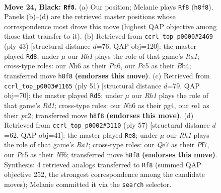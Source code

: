 \documentclass[11pt]{article}
\begin{document}
\clearpage

\begin{figure}[p]\centering
\begin{subfigure}{0.46\textwidth}\centering
\resizebox{\linewidth}{!}{%
\newchessgame
\chessboard[
  setfen={1k5r/p1p1q1pp/1p2p2n/2p1Q3/8/2P2P2/1P4PP/2K1R3 b - - 3 24},
  showmover=false,
  pgfstyle=straightmove, color=movearrow, markmove={h8-f8}
]}
\caption{}
\end{subfigure}\hfill
\begin{subfigure}{0.46\textwidth}\centering
\resizebox{\linewidth}{!}{%
\newchessgame
\chessboard[
  setfen={r5k1/1p2qppp/p7/3Qp3/PbP5/4P3/1B3PPP/R5K1 b - - 2 22},
  showmover=false,
  pgfstyle=straightmove, color=movearrow, markmove={a8-d8}
]}
\caption{}
\end{subfigure}
\\[4pt]
\begin{subfigure}{0.46\textwidth}\centering
\resizebox{\linewidth}{!}{%
\newchessgame
\chessboard[
  setfen={3r2k1/2q1pp1p/2p3p1/p7/P1Q2PP1/1P6/2P4P/2K1R3 b - - 2 26},
  showmover=false,
  pgfstyle=straightmove, color=movearrow, markmove={d8-d5}
]}
\caption{}
\end{subfigure}\hfill
\begin{subfigure}{0.46\textwidth}\centering
\resizebox{\linewidth}{!}{%
\newchessgame
\chessboard[
  setfen={r5k1/p1q2p2/1p3np1/2p3Q1/5P2/2P3N1/P5PP/4R1K1 b - - 0 29},
  showmover=false,
  pgfstyle=straightmove, color=movearrow, markmove={a8-e8}
]}
\caption{}
\end{subfigure}
\caption{\textbf{Move 24, Black: \texttt{Rf8}.} (a) Our position; Melanie plays \texttt{Rf8} (\texttt{h8f8}). Panels (b)--(d) are the retrieved master positions whose correspondence most drove this move (highest QAP objective among those that transfer to it). (b) Retrieved from \texttt{ccrl\_top\_p0000\#2469} (ply 43) [structural distance $d$=76, QAP obj=120]: the master played \texttt{Rd8}; under $\mu$ our \emph{Rh1} plays the role of that game's \emph{Ra1}; cross-type roles: our \emph{N}h6 as their \emph{P}a6, our \emph{P}c5 as their \emph{B}b4; transferred move \texttt{h8f8} \textbf{(endorses this move)}. (c) Retrieved from \texttt{ccrl\_top\_p0003\#1165} (ply 51) [structural distance $d$=79, QAP obj=70]: the master played \texttt{Rd5}; under $\mu$ our \emph{Rh1} plays the role of that game's \emph{Rd1}; cross-type roles: our \emph{N}h6 as their \emph{p}g4, our \emph{r}e1 as their \emph{p}c2; transferred move \texttt{h8f8} \textbf{(endorses this move)}. (d) Retrieved from \texttt{ccrl\_top\_p0002\#3110} (ply 57) [structural distance $d$=62, QAP obj=41]: the master played \texttt{Re8}; under $\mu$ our \emph{Rh1} plays the role of that game's \emph{Ra1}; cross-type roles: our \emph{Q}e7 as their \emph{P}f7, our \emph{P}c5 as their \emph{N}f6; transferred move \texttt{h8f8} \textbf{(endorses this move)}. Synthesis: 4 retrieved analogs transferred to \texttt{Rf8} (summed QAP objective 252, the strongest correspondence among the candidate moves); Melanie committed it via the \texttt{search} selector.}
\label{fig:thought-m47}
\end{figure}
\end{document}
